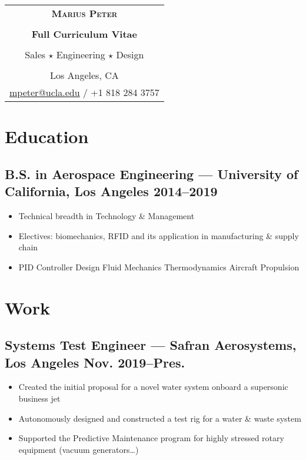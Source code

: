 \documentclass[10pt]{article}
\date{}
\title{}
\begin{document}
\begin{center}
\begin{tabular}{c}
\huge \textbf{\textsc{Marius Peter}}\\
\\
\large \textbf{Full Curriculum Vitae}\\
\\
\Large Sales \(\star\) Engineering \(\star\) Design\\
\\
Los Angeles, CA\\
\href{mailto:mpeter@ucla.edu}{mpeter@ucla.edu} / +1 818 284 3757\\
\end{tabular}

\end{center}

\section*{Education}
\label{sec:org9a91925}

\subsection*{B.S. in Aerospace Engineering --- University of California, Los Angeles \hfill 2014--2019}
\label{sec:orged433fb}

\begin{itemize}
\item Technical breadth in Technology \& Management
\item Electives: biomechanics, RFID and its application in manufacturing \& supply
chain
\item PID Controller Design \textbullet
Fluid Mechanics \textbullet
Thermodynamics \textbullet
Aircraft Propulsion \textbullet
\end{itemize}

\section*{Work}
\label{sec:org4f0e3b1}

\subsection*{Systems Test Engineer --- Safran Aerosystems, Los Angeles \hfill Nov. 2019--Pres.}
\label{sec:org284a3f4}

\begin{itemize}
\item Created the initial proposal for a novel water system onboard a supersonic
business jet
\item Autonomously designed and constructed a test rig for a water \& waste system
\item Supported the Predictive Maintenance program for highly stressed rotary
equipment (vacuum generators\ldots{})
\end{itemize}
\end{document}
